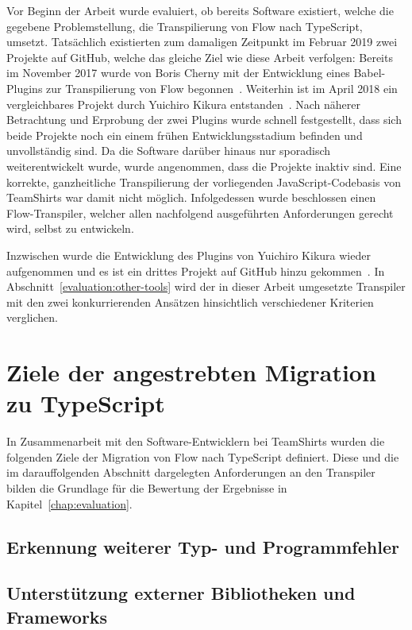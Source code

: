 Vor Beginn der Arbeit wurde evaluiert, ob bereits Software existiert, welche die gegebene Problemstellung, die Transpilierung von Flow nach TypeScript, umsetzt. Tatsächlich existierten zum damaligen Zeitpunkt im Februar 2019 zwei Projekte auf GitHub, welche das gleiche Ziel wie diese Arbeit verfolgen: Bereits im November 2017 wurde von Boris Cherny mit der Entwicklung eines Babel-Plugins zur Transpilierung von Flow begonnen~\autocite{CHERNY:FLOW_TO_TS}. Weiterhin ist im April 2018 ein vergleichbares Projekt durch Yuichiro Kikura entstanden~\autocite{KIKURA:FLOW_TO_TS}. Nach näherer Betrachtung und Erprobung der zwei Plugins wurde schnell festgestellt, dass sich beide Projekte noch ein einem frühen Entwicklungsstadium befinden und unvollständig sind. Da die Software darüber hinaus nur sporadisch weiterentwickelt wurde, wurde angenommen, dass die Projekte inaktiv sind. Eine korrekte, ganzheitliche Transpilierung der vorliegenden JavaScript-Codebasis von TeamShirts war damit nicht möglich. Infolgedessen wurde beschlossen einen Flow-Transpiler, welcher allen nachfolgend ausgeführten Anforderungen gerecht wird, selbst zu entwickeln.

Inzwischen wurde die Entwicklung des Plugins von Yuichiro Kikura wieder aufgenommen und es ist ein drittes Projekt auf GitHub hinzu gekommen~\autocite{KHAN:FLOW_TO_TS}. In Abschnitt~\ref{evaluation:other-tools} wird der in dieser Arbeit umgesetzte Transpiler mit den zwei konkurrierenden Ansätzen hinsichtlich verschiedener Kriterien verglichen.

\section{Ziele der angestrebten Migration zu TypeScript}
\label{analysis:goals}

In Zusammenarbeit mit den Software-Entwicklern bei TeamShirts wurden die folgenden Ziele der Migration von Flow nach TypeScript definiert. Diese und die im darauffolgenden Abschnitt dargelegten Anforderungen an den Transpiler bilden die Grundlage für die Bewertung der Ergebnisse in Kapitel~\ref{chap:evaluation}.

\subsection{Erkennung weiterer Typ- und Programmfehler}



\subsection{Unterstützung externer Bibliotheken und Frameworks}

